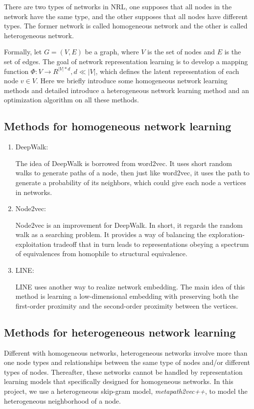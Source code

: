 \documentclass[conference]{IEEEtran}
\begin{document}
There are two types of networks in NRL, one supposes that all nodes in the network have the same type, and the other supposes that all nodes have different types. The former network is called homogeneous network and the other is called heterogeneous network.

Formally, let $G=(V,E)$ be a graph, where $V$ is the set of nodes and $E$ is the set of edges. The goal of network representation learning is to develop a mapping function $\Phi:V\rightarrow R^{|V|*d},d\ll|V|$, which defines the latent representation of each node $v\in V$. Here we briefly introduce some homogeneous network learning methods and detailed introduce a heterogeneous network learning method and an optimization algorithm on all these methods.
\subsection*{Methods for homogeneous network learning}
\begin{enumerate}
	\item DeepWalk:
	
	The idea of DeepWalk\cite{Perozzi:2014:DOL:2623330.2623732} is borrowed from word2vec. It uses short random walks to generate paths of a node, then just like word2vec, it uses the path to generate a probability of its neighbors, which could give each node a vertices in networks.
		\item Node2vec:
		
		Node2vec\cite{DBLP:journals/corr/GroverL16} is an improvement for DeepWalk. In short, it regards the random walk as a searching problem. It provides a way of balancing the exploration-exploitation tradeoff that in turn leads to representations obeying a spectrum of equivalences from homophile to structural equivalence.
	\item LINE:
	
	LINE\cite{tang2015line} uses another way to realize network embedding. The main idea of this method is learning a low-dimensional embedding with preserving both the first-order proximity and the second-order proximity between the vertices.
\end{enumerate}
\subsection*{Methods for heterogeneous network learning}
Different with homogeneous networks, heterogeneous networks involve more than one node types and relationships between the same type of nodes and/or different types of nodes. Thereafter, these networks cannot be handled by representation learning models that specifically designed for homogeneous networks. In this project, we use a heterogeneous skip-gram model, \emph{metapath2vec++}\cite{dong2017metapath2vec}, to model the heterogeneous neighborhood of a node.
\end{document}
